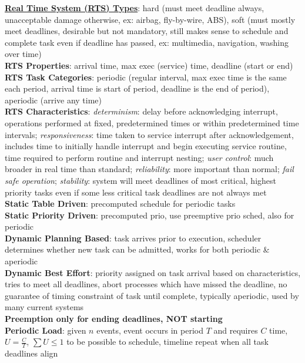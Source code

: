 \documentclass[a4paper]{article}
\begin{document}
\begin{multicols}{2}
        \underline{\textbf{Real Time System  (RTS) Types}}: hard (must meet deadline always, unacceptable damage otherwise, ex: airbag, fly-by-wire, ABS), soft (must mostly meet deadlines, desirable but not mandatory, still makes sense to schedule and complete task even if deadline has passed, ex: multimedia, navigation, washing over time)\\
        \textbf{RTS Properties}: arrival time, max exec (service) time, deadline (start or end)\\
        \textbf{RTS Task Categories}: periodic (regular interval, max exec time is the same each period, arrival time is start of period, deadline is the end of period), aperiodic (arrive any time)\\
        \textbf{RTS Characteristics}:
        \textit{determinism}: delay before acknowledging interrupt, operations performed at fixed, predetermined times or within predetermined time intervals;
        \textit{responsiveness}: time taken to service interrupt after acknowledgement, includes time to initially handle interrupt and begin executing service routine, time required to perform routine and interrupt nesting;
        \textit{user control}: much broader in real time than standard;
        \textit{reliability}: more important than normal;
        \textit{fail safe operation};
        \textit{stability}: system will meet deadlines of most critical, highest priority tasks even if some less critical task deadlines are not always met\\
        \textbf{Static Table Driven}: precomputed schedule for periodic tasks\\
        \textbf{Static Priority Driven}: precomputed prio, use preemptive prio sched, also for periodic\\
        \textbf{Dynamic Planning Based}: task arrives prior to execution, scheduler determines whether new task can be admitted, works for both periodic \& aperiodic\\
        \textbf{Dynamic Best Effort}: priority assigned on task arrival based on characteristics, tries to meet all deadlines, abort processes which have missed the deadline, no guarantee of timing constraint of task until complete, typically aperiodic, used by many current systems\\
        \textbf{Preemption only for ending deadlines, NOT starting}\\
        \textbf{Periodic Load}: given $n$ events, event occurs in period $T$ and requires $C$ time, $U = \frac{C}{T}$, $\sum U \leq 1$ to be possible to schedule, timeline repeat when all task deadlines align\\

\end{multicols}
\end{document}
